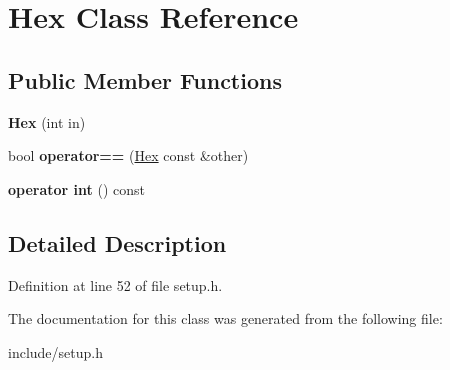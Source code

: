 \hypertarget{classHex}{\section{Hex Class Reference}
\label{classHex}
}
\subsection*{Public Member Functions}
\begin{DoxyCompactItemize}
\item 
\hypertarget{classHex_a965f0c9a560e141ef72e48fd62063f00}{{\bfseries Hex} (int in)}\label{classHex_a965f0c9a560e141ef72e48fd62063f00}

\item 
\hypertarget{classHex_a2f87c76d8bc64c0e2a49649d5bd5bcdb}{bool {\bfseries operator==} (\hyperlink{classHex}{Hex} const \&other)}\label{classHex_a2f87c76d8bc64c0e2a49649d5bd5bcdb}

\item 
\hypertarget{classHex_aba946c1cee6961c383f4bd0e5f6a2c81}{{\bfseries operator int} () const }\label{classHex_aba946c1cee6961c383f4bd0e5f6a2c81}

\end{DoxyCompactItemize}


\subsection{Detailed Description}


Definition at line 52 of file setup.\-h.



The documentation for this class was generated from the following file\-:\begin{DoxyCompactItemize}
\item 
include/setup.\-h\end{DoxyCompactItemize}

